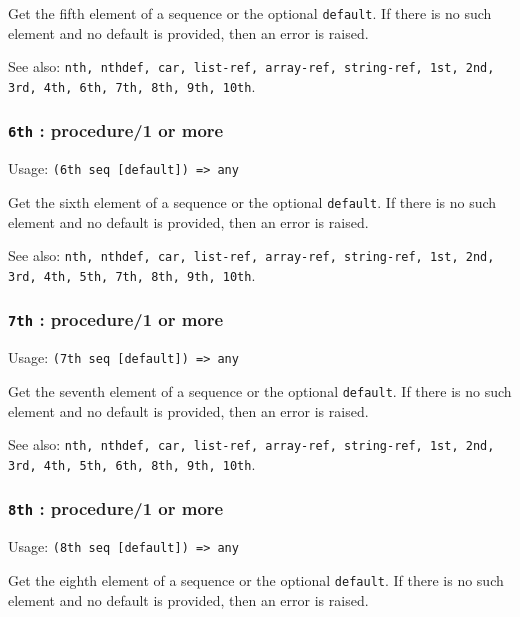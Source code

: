 \documentclass[
]{article}
\newcommand{\passthrough}[1]{#1}
\begin{document}
Get the fifth element of a sequence or the optional
\passthrough{\lstinline!default!}. If there is no such element and no
default is provided, then an error is raised.

See also:
\passthrough{\lstinline!nth, nthdef, car, list-ref, array-ref, string-ref, 1st, 2nd, 3rd, 4th, 6th, 7th, 8th, 9th, 10th!}.

\hypertarget{th-procedure1-or-more-3}{%
\subsubsection{\texorpdfstring{\texttt{6th} : procedure/1 or
more}{6th : procedure/1 or more}}\label{th-procedure1-or-more-3}}

Usage: \passthrough{\lstinline!(6th seq [default]) => any!}

Get the sixth element of a sequence or the optional
\passthrough{\lstinline!default!}. If there is no such element and no
default is provided, then an error is raised.

See also:
\passthrough{\lstinline!nth, nthdef, car, list-ref, array-ref, string-ref, 1st, 2nd, 3rd, 4th, 5th, 7th, 8th, 9th, 10th!}.

\hypertarget{th-procedure1-or-more-4}{%
\subsubsection{\texorpdfstring{\texttt{7th} : procedure/1 or
more}{7th : procedure/1 or more}}\label{th-procedure1-or-more-4}}

Usage: \passthrough{\lstinline!(7th seq [default]) => any!}

Get the seventh element of a sequence or the optional
\passthrough{\lstinline!default!}. If there is no such element and no
default is provided, then an error is raised.

See also:
\passthrough{\lstinline!nth, nthdef, car, list-ref, array-ref, string-ref, 1st, 2nd, 3rd, 4th, 5th, 6th, 8th, 9th, 10th!}.

\hypertarget{th-procedure1-or-more-5}{%
\subsubsection{\texorpdfstring{\texttt{8th} : procedure/1 or
more}{8th : procedure/1 or more}}\label{th-procedure1-or-more-5}}

Usage: \passthrough{\lstinline!(8th seq [default]) => any!}

Get the eighth element of a sequence or the optional
\passthrough{\lstinline!default!}. If there is no such element and no
default is provided, then an error is raised.
\end{document}
